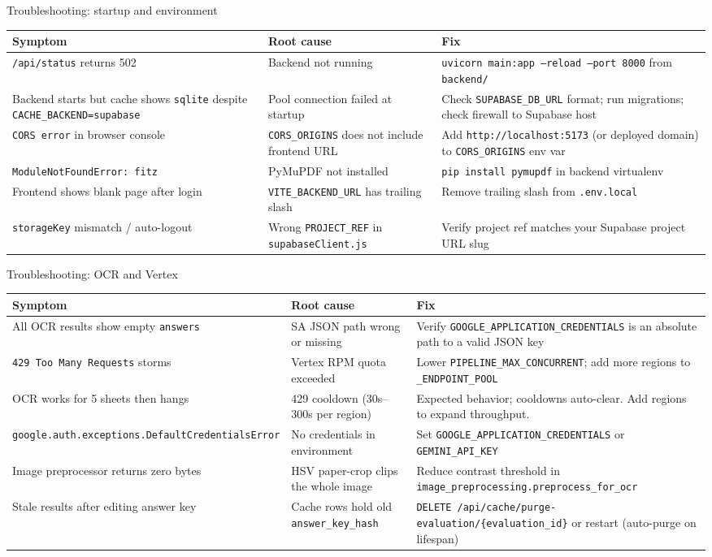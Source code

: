 \documentclass[aspectratio=169]{beamer}
\begin{document}
\begin{frame}{Troubleshooting: startup and environment}
  \tiny
  \begin{tabular}{@{}p{4.2cm}p{4.4cm}p{5.1cm}@{}}
    \toprule
    Symptom & Root cause & Fix \\
    \midrule
    \texttt{/api/status} returns 502 & Backend not running & \texttt{uvicorn main:app --reload --port 8000} from \texttt{backend/} \\
    Backend starts but cache shows \texttt{sqlite} despite \texttt{CACHE\_BACKEND=supabase} & Pool connection failed at startup & Check \texttt{SUPABASE\_DB\_URL} format; run migrations; check firewall to Supabase host \\
    \texttt{CORS error} in browser console & \texttt{CORS\_ORIGINS} does not include frontend URL & Add \texttt{http://localhost:5173} (or deployed domain) to \texttt{CORS\_ORIGINS} env var \\
    \texttt{ModuleNotFoundError: fitz} & PyMuPDF not installed & \texttt{pip install pymupdf} in backend virtualenv \\
    Frontend shows blank page after login & \texttt{VITE\_BACKEND\_URL} has trailing slash & Remove trailing slash from \texttt{.env.local} \\
    \texttt{storageKey} mismatch / auto-logout & Wrong \texttt{PROJECT\_REF} in \texttt{supabaseClient.js} & Verify project ref matches your Supabase project URL slug \\
    \bottomrule
  \end{tabular}
\end{frame}

\begin{frame}{Troubleshooting: OCR and Vertex}
  \tiny
  \begin{tabular}{@{}p{4.2cm}p{4.4cm}p{5.1cm}@{}}
    \toprule
    Symptom & Root cause & Fix \\
    \midrule
    All OCR results show empty \texttt{answers} & SA JSON path wrong or missing & Verify \texttt{GOOGLE\_APPLICATION\_CREDENTIALS} is an absolute path to a valid JSON key \\
    \texttt{429 Too Many Requests} storms & Vertex RPM quota exceeded & Lower \texttt{PIPELINE\_MAX\_CONCURRENT}; add more regions to \texttt{\_ENDPOINT\_POOL} \\
    OCR works for 5 sheets then hangs & 429 cooldown (30s--300s per region) & Expected behavior; cooldowns auto-clear. Add regions to expand throughput. \\
    \texttt{google.auth.exceptions.DefaultCredentialsError} & No credentials in environment & Set \texttt{GOOGLE\_APPLICATION\_CREDENTIALS} or \texttt{GEMINI\_API\_KEY} \\
    Image preprocessor returns zero bytes & HSV paper-crop clips the whole image & Reduce contrast threshold in \texttt{image\_preprocessing.preprocess\_for\_ocr} \\
    Stale results after editing answer key & Cache rows hold old \texttt{answer\_key\_hash} & \texttt{DELETE /api/cache/purge-evaluation/\{evaluation\_id\}} or restart (auto-purge on lifespan) \\
    \bottomrule
  \end{tabular}
\end{frame}
\end{document}
